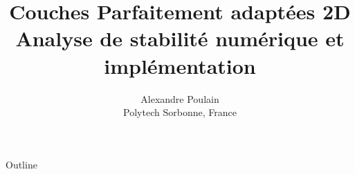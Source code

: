 \documentclass[roman]{beamer}
\author[.@epfl.ch]{Alexandre Poulain \\
Polytech Sorbonne, France}
\title[Perfectly Matched Layer]{Couches Parfaitement adaptées 2D \\ \small{Analyse de stabilité numérique et implémentation}}
\begin{document}
 
%
\frame{\titlepage}
\begin{frame}{Outline}
\tableofcontents
\end{frame}
%

%





\end{document}
